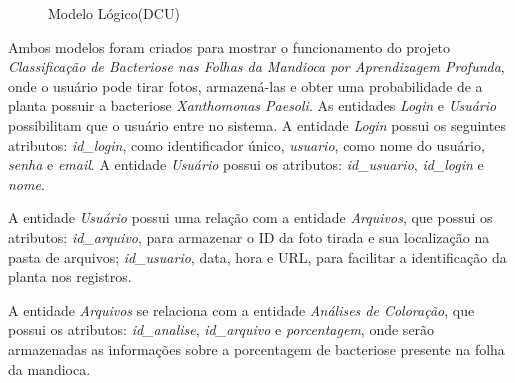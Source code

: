     \begin{figure}[H]
        \centering
        \caption{Modelo Lógico(DCU)}%
        \label{phot:pg-14}
    \end{figure}
    
   Ambos modelos foram criados para mostrar o funcionamento do projeto \textit{Classificação de Bacteriose nas Folhas da Mandioca por Aprendizagem Profunda}, onde o usuário pode tirar fotos, armazená-las e obter uma probabilidade de a planta possuir a bacteriose \textit{Xanthomonas Paesoli}. As entidades \textit{Login} e \textit{Usuário} possibilitam que o usuário entre no sistema. A entidade \textit{Login} possui os seguintes atributos: \textit{id\_login}, como identificador único, \textit{usuario}, como nome do usuário, \textit{senha} e \textit{email}. A entidade \textit{Usuário} possui os atributos: \textit{id\_usuario}, \textit{id\_login} e \textit{nome}. 

    A entidade \textit{Usuário} possui uma relação com a entidade \textit{Arquivos}, que possui os atributos: \textit{id\_arquivo}, para armazenar o ID da foto tirada e sua localização na pasta de arquivos; \textit{id\_usuario}, data, hora e URL, para facilitar a identificação da planta nos registros. 
    
    A entidade \textit{Arquivos} se relaciona com a entidade \textit{Análises de Coloração}, que possui os atributos: \textit{id\_analise}, \textit{id\_arquivo} e \textit{porcentagem}, onde serão armazenadas as informações sobre a porcentagem de bacteriose presente na folha da mandioca. 
    
